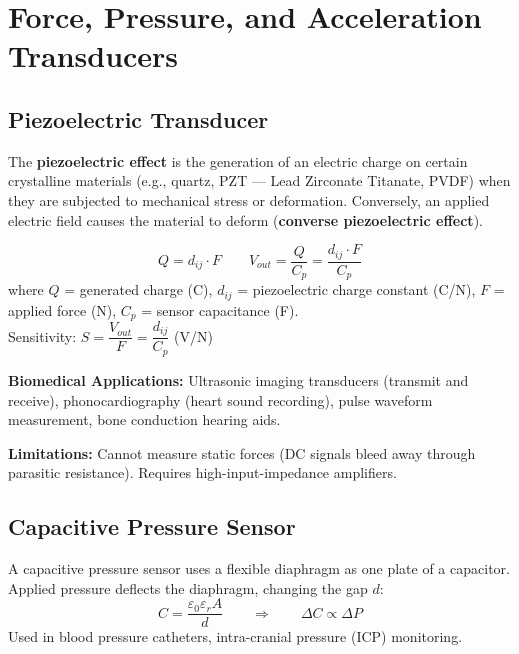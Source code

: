 \documentclass[12pt,a4paper]{article}
\begin{document}
\section{Force, Pressure, and Acceleration Transducers}

\subsection{Piezoelectric Transducer}

\begin{tcolorbox}[defbox, title={\textbf{Piezoelectric Effect}}]
The \textbf{piezoelectric effect} is the generation of an electric charge on certain crystalline materials (e.g., quartz, PZT --- Lead Zirconate Titanate, PVDF) when they are subjected to mechanical stress or deformation. Conversely, an applied electric field causes the material to deform (\textbf{converse piezoelectric effect}).
\end{tcolorbox}

\begin{tcolorbox}[formulabox, title={\textbf{Piezoelectric Sensor Equations}}]
\[
Q = d_{ij} \cdot F \qquad V_{out} = \frac{Q}{C_p} = \frac{d_{ij} \cdot F}{C_p}
\]
where $Q$ = generated charge (C), $d_{ij}$ = piezoelectric charge constant (C/N), $F$ = applied force (N), $C_p$ = sensor capacitance (F). \\[4pt]
Sensitivity: $S = \dfrac{V_{out}}{F} = \dfrac{d_{ij}}{C_p}$ \quad (V/N)
\end{tcolorbox}

\textbf{Biomedical Applications:} Ultrasonic imaging transducers (transmit and receive), phonocardiography (heart sound recording), pulse waveform measurement, bone conduction hearing aids.

\textbf{Limitations:} Cannot measure static forces (DC signals bleed away through parasitic resistance). Requires high-input-impedance amplifiers.

\subsection{Capacitive Pressure Sensor}

A capacitive pressure sensor uses a flexible diaphragm as one plate of a capacitor. Applied pressure deflects the diaphragm, changing the gap $d$:
\[
C = \frac{\varepsilon_0 \varepsilon_r A}{d} \qquad \Rightarrow \qquad \Delta C \propto \Delta P
\]
Used in blood pressure catheters, intra-cranial pressure (ICP) monitoring.
\end{document}
